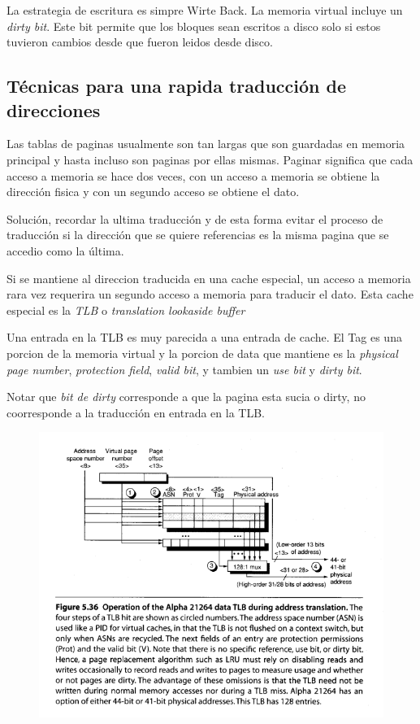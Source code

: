 \documentclass{article}
\begin{document}
La estrategia de escritura es simpre Wirte Back. La memoria virtual incluye un \textit{dirty bit}. Este bit permite que los bloques sean escritos a disco solo si estos tuvieron cambios desde que fueron leidos desde disco.

\newpage
\subsection{Técnicas para una rapida traducción de direcciones}

Las tablas de paginas usualmente son tan largas que son guardadas en memoria principal y hasta incluso son paginas por ellas mismas. Paginar significa que cada acceso a memoria se hace dos veces, con un acceso a memoria se obtiene la dirección fisica y con un segundo acceso se obtiene el dato.

Solución, recordar la ultima traducción y de esta forma evitar el proceso de traducción si la dirección que se quiere referencias es la misma pagina que se accedio como la última.

Si se mantiene al direccion traducida en una cache especial, un acceso a memoria rara vez requerira un segundo acceso a memoria para traducir el dato. Esta cache especial es la \textit{TLB} o \textit{translation lookaside buffer}

Una entrada en la TLB es muy parecida a una entrada de cache. El Tag es una porcion de la memoria virtual y la porcion de data que mantiene es la \textit{physical page number}, \textit{protection field}, \textit{valid bit}, y tambien un \textit{use bit} y \textit{dirty bit}.

Notar que \textit{bit de dirty} corresponde a que la pagina esta sucia o dirty, no coorresponde a la traducción en entrada en la TLB.

\begin{figure}[h!]
    \includegraphics[width=\linewidth]{imagenes/TLB.png}
\end{figure}
\end{document}
